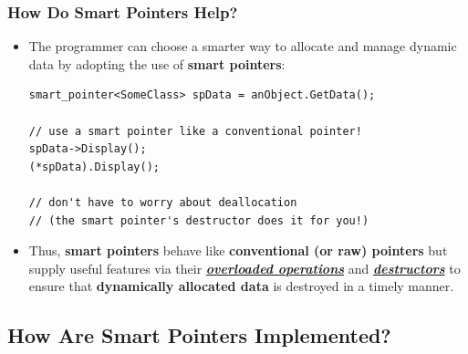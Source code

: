 \documentclass[10pt]{article}
\begin{document}
\newpage
\subsubsection{How Do Smart Pointers Help?}
\begin{itemize}
	\item The programmer can choose a smarter way to allocate and manage dynamic data by adopting the use of \textbf{smart pointers}:
		\begin{verbatim}
smart_pointer<SomeClass> spData = anObject.GetData();

// use a smart pointer like a conventional pointer!
spData->Display();
(*spData).Display();

// don't have to worry about deallocation
// (the smart pointer's destructor does it for you!)
		\end{verbatim}

	\item Thus, \textbf{smart pointers} behave like \textbf{conventional (or raw) pointers} but supply useful features via their \underline{\textit{\textbf{overloaded operations}}} and \underline{\textbf{\textit{destructors}}} to ensure that \textbf{dynamically allocated data} is destroyed in a timely manner.
\end{itemize}

\newpage
\subsection{How Are Smart Pointers Implemented?}
\end{document}
